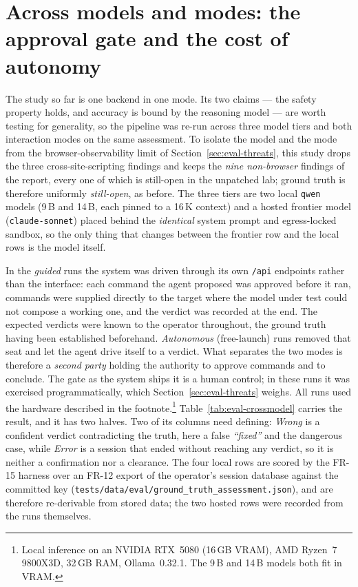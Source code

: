 \section{Across models and modes: the approval gate and the cost of autonomy}
\label{sec:eval-crossmodel}

The study so far is one backend in one mode. Its two claims --- the safety property
holds, and accuracy is bound by the reasoning model --- are worth testing for
generality, so the pipeline was re-run across three model tiers and both interaction
modes on the same assessment. To isolate the model and the mode from the
browser-observability limit of Section~\ref{sec:eval-threats}, this study drops the
three cross-site-scripting findings and keeps the \emph{nine non-browser} findings of
the report, every one of which is still-open in the unpatched lab; ground truth is
therefore uniformly \emph{still-open}, as before. The three tiers are two local
\texttt{qwen} models (9\,B and 14\,B, each pinned to a 16\,K context) and a
hosted frontier model (\texttt{claude-sonnet}) placed behind the \emph{identical}
system prompt and egress-locked sandbox, so the only thing that changes between the
frontier row and the local rows is the model itself.

In the \emph{guided} runs the system was driven through its own \texttt{/api} endpoints
rather than the interface: each command the agent proposed was approved before it ran,
commands were supplied directly to the target where the model under test could not compose
a working one, and the verdict was recorded at the end. The expected verdicts were known
to the operator throughout, the ground truth having been established beforehand.
\emph{Autonomous} (free-launch) runs removed that seat and let the agent drive itself to a
verdict. What separates the two modes is therefore a \emph{second party} holding the
authority to approve commands and to conclude. The gate as the system ships it is a human
control; in these runs it was exercised programmatically, which
Section~\ref{sec:eval-threats} weighs. All runs used the hardware described in the
footnote.\footnote{Local inference on an NVIDIA RTX~5080 (16\,GB VRAM), AMD Ryzen~7
9800X3D, 32\,GB RAM, Ollama~0.32.1. The 9\,B and 14\,B models both fit in VRAM.}
Table~\ref{tab:eval-crossmodel} carries the result, and it has two halves. Two of its
columns need defining: \emph{Wrong} is a confident verdict contradicting the truth, here
a false \emph{``fixed''} and the dangerous case, while \emph{Error} is a session that
ended without reaching any verdict, so it is neither a confirmation nor a clearance. The
four local rows are scored by the FR-15 harness over an FR-12 export of the operator's
session database against the committed key
(\texttt{tests/data/eval/ground\_truth\_assessment.json}), and are therefore re-derivable
from stored data; the two hosted rows were recorded from the runs themselves.

